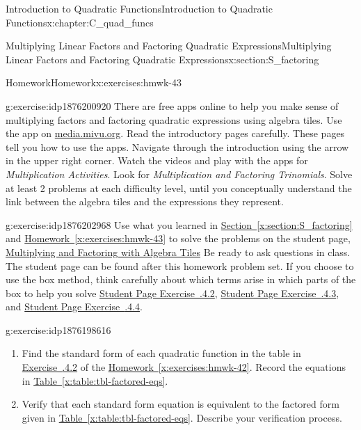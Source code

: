 \documentclass[oneside,10pt,]{book}
\newcommand{\xreffont}{\relax}
\newcommand{\pubtitle}[1]{\textsl{#1}}
\numberwithin{equation}{chapter}
\begin{document}
\begin{chapterptx}{Introduction to Quadratic Functions}{}{Introduction to Quadratic Functions}{}{}{x:chapter:C_quad_funcs}
\begin{sectionptx}{Multiplying Linear Factors and Factoring Quadratic Expressions}{}{Multiplying Linear Factors and Factoring Quadratic Expressions}{}{}{x:section:S_factoring}
\begin{exercises-subsection}{Homework}{}{Homework}{}{}{x:exercises:hmwk-43}
\begin{divisionexercise}{2}{}{}{g:exercise:idp1876200920}%
There are free apps online to help you make sense of multiplying factors and factoring quadratic expressions using algebra tiles. Use the app on \href{http://media.mivu.org/mvu_pd/a4a/homework/index.html}{media.mivu.org}\footnotemark{}. Read the introductory pages carefully. These pages tell you how to use the apps. Navigate through the introduction using the arrow in the upper right corner. Watch the videos and play with the apps for \pubtitle{Multiplication Activities}. Look for \pubtitle{Multiplication and Factoring Trinomials}. Solve at least 2 problems at each difficulty level, until you conceptually understand the link between the algebra tiles and the expressions they represent.%
\end{divisionexercise}%
%
\begin{divisionexercise}{3}{}{}{g:exercise:idp1876202968}%
Use what you learned in \hyperref[x:section:S_factoring]{Section~{\xreffont\ref{x:section:S_factoring}}} and \hyperref[x:exercises:hmwk-43]{Homework~{\xreffont\ref{x:exercises:hmwk-43}}} to solve the problems on the student page, \hyperref[x:worksheet:act-mult-fact-tiles]{Multiplying and Factoring with Algebra Tiles} Be ready to ask questions in class. The student page can be found after this homework problem set. If you choose to use the box method, think carefully about which terms arise in which parts of the box to help you solve \hyperlink{x:exercise:exer-factor-quad-2}{Student Page Exercise~{\xreffont 4.3.4.2}}, \hyperlink{x:exercise:exer-factor-quad-3}{Student Page Exercise~{\xreffont 4.3.4.3}}, and \hyperlink{x:exercise:exer-factor-quad-4}{Student Page Exercise~{\xreffont 4.3.4.4}}.%
\end{divisionexercise}%
\begin{divisionexercise}{4}{}{}{g:exercise:idp1876198616}%
\begin{enumerate}[font=\bfseries,label=(\alph*),ref=\alph*]
\item{}Find the standard form of each quadratic function in the table in \hyperlink{x:exercise:exer-factored-eqs}{Exercise~{\xreffont 4.2.4.2}} of the \hyperref[x:exercises:hmwk-42]{Homework~{\xreffont\ref{x:exercises:hmwk-42}}}. Record the equations in \hyperref[x:table:tbl-factored-eqs]{Table~{\xreffont\ref{x:table:tbl-factored-eqs}}}.%
\item{}Verify that each standard form equation is equivalent to the factored form given in \hyperref[x:table:tbl-factored-eqs]{Table~{\xreffont\ref{x:table:tbl-factored-eqs}}}. Describe your verification process.%

\end{enumerate}
\end{divisionexercise}
\end{exercises-subsection}
\end{sectionptx}
\end{chapterptx}
\end{document}
